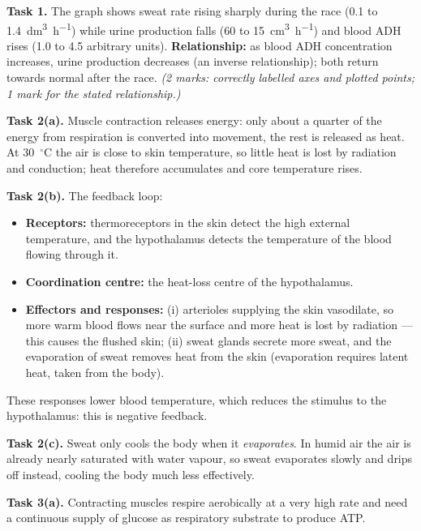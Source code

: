 \documentclass[11pt]{article}
\newcommand{\cle}[1]{{\popxbold\color{popdark}#1}}
\newcounter{popsec}
\newcounter{popsub}
\newcommand{\courssub}[1]{%
  \stepcounter{popsub}%
  \par\vspace{9pt}\noindent{\popxbold\fontsize{11.5}{13}\selectfont\color{popink}{\color{poporange}\thepopsec.\thepopsub}\hspace{6pt}#1}\par\nopagebreak\vspace{4pt}
}
\begin{document}
\courssub{Model answer}

\begin{corrige}

\textbf{Task 1.} The graph shows sweat rate rising sharply during the race (0.1 to \SI{1.4}{dm^{3}.h^{-1}}) while urine production falls (60 to \SI{15}{cm^{3}.h^{-1}}) and blood ADH rises (1.0 to 4.5 arbitrary units). \textbf{Relationship:} as blood ADH concentration increases, urine production decreases (an inverse relationship); both return towards normal after the race. \emph{(2 marks: correctly labelled axes and plotted points; 1 mark for the stated relationship.)}

\textbf{Task 2(a).} Muscle contraction releases energy: only about a quarter of the energy from respiration is converted into movement, the rest is released as \cle{heat}. At \SI{30}{\ensuremath{{}^{\circ}\mathrm{C}}} the air is close to skin temperature, so little heat is lost by radiation and conduction; heat therefore accumulates and core temperature rises.

\textbf{Task 2(b).} The feedback loop:
\begin{itemize}
\item \textbf{Receptors:} thermoreceptors in the skin detect the high external temperature, and the \cle{hypothalamus} detects the temperature of the blood flowing through it.
\item \textbf{Coordination centre:} the heat-loss centre of the \cle{hypothalamus}.
\item \textbf{Effectors and responses:} (i) arterioles supplying the skin \cle{vasodilate}, so more warm blood flows near the surface and more heat is lost by radiation — this causes the flushed skin; (ii) \cle{sweat glands} secrete more sweat, and the \cle{evaporation} of sweat removes heat from the skin (evaporation requires latent heat, taken from the body).
\end{itemize}
These responses lower blood temperature, which reduces the stimulus to the hypothalamus: this is \cle{negative feedback}.

\textbf{Task 2(c).} Sweat only cools the body when it \emph{evaporates}. In humid air the air is already nearly saturated with water vapour, so sweat evaporates slowly and drips off instead, cooling the body much less effectively.

\textbf{Task 3(a).} Contracting muscles respire aerobically at a very high rate and need a continuous supply of \cle{glucose} as respiratory substrate to produce ATP.


\end{corrige}
\end{document}
